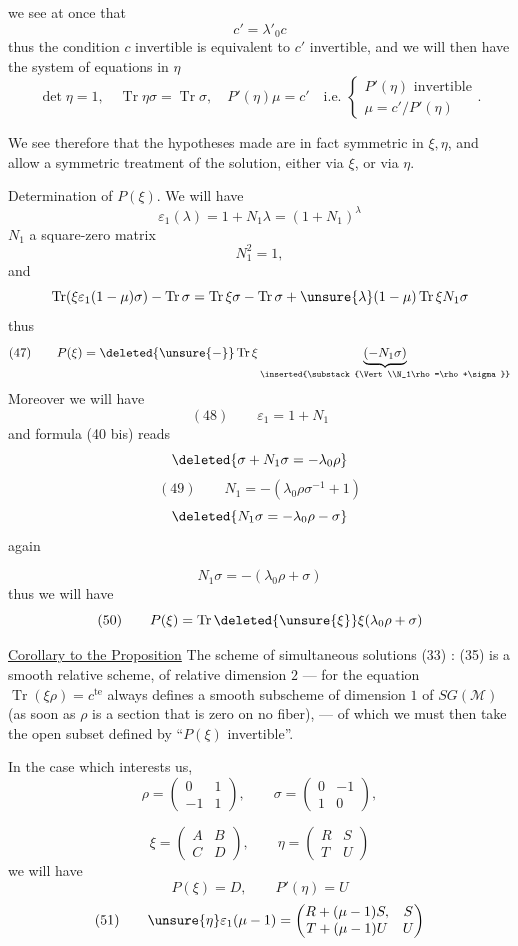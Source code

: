 
we see at once that
\[
c'=\lambda'_0c
\]
thus the condition $c$ invertible is equivalent to $c'$ invertible,
and we will then have the system of equations in $\eta$
\[
\det\eta=1,\quad
\operatorname{Tr}\eta\sigma=\operatorname{Tr}\sigma,\quad
P'(\eta)\mu=c'\quad\text{i.e. }
\left\{
\begin{gathered}
P'(\eta)\text{ invertible}\\
\mu=c'/P'(\eta)
\end{gathered}
\right.
.
\]

We see therefore that the hypotheses made are in fact symmetric in
$\xi,\eta$, and allow a symmetric treatment of the solution,
either via $\xi$, or via $\eta$.

Determination of $P(\xi)$. We will have
\[
\varepsilon_1(\lambda)=1+N_1\lambda=(1+N_1)^\lambda
\]
$N_1$ a square-zero matrix
\[
N_1^2=1,
\]
and
\[
\operatorname{Tr}(\xi\varepsilon_1(1-\mu)\sigma)-\operatorname{Tr}\sigma
=\operatorname{Tr}\xi\sigma-\operatorname{Tr}\sigma
+\unsure{\lambda}(1-\mu)\operatorname{Tr}\xi N_1\sigma
\]
thus
\[
(47)\qquad
P(\xi)=\deleted{\unsure{-}}\operatorname{Tr}\xi
\underbrace{(-N_1\sigma)}_{\inserted{\substack{\Vert\\N_1\rho=\rho+\sigma}}}
\]
Moreover  we will have
\[
(48)\qquad \varepsilon_1=1+N_1
\]
and formula (40 bis) reads
\[
\deleted{\sigma+N_1\sigma=-\lambda_0\rho}
\]
\[
(49)\qquad N_1=-(\lambda_0\rho\sigma^{-1}+1)
\]
\[
\deleted{N_1\sigma=-\lambda_0\rho-\sigma}
\]
  again


\[
N_1\sigma=-(\lambda_0\rho+\sigma)
\]
thus we will have
\[
(50)\qquad
P(\xi)=\operatorname{Tr}\deleted{\unsure{\xi}}\xi(\lambda_0\rho+\sigma)
\]

\uline{Corollary to the Proposition} The scheme of simultaneous solutions
 (33) : (35)
 is a smooth relative scheme,
of relative dimension $2$ --- for the equation $\operatorname{Tr}(\xi\rho)=c^{\mathrm{te}}$
always defines a smooth subscheme of dimension $1$
of  $SG(\mathcal{M})$
(as soon as $\rho$ is a section that is zero on no fiber),
--- of which we must then take the open subset defined by
``$P(\xi)$ invertible''.

In the case which interests us,
\[
\rho=\begin{pmatrix}0&1\\-1&1\end{pmatrix},\qquad
\sigma=\begin{pmatrix}0&-1\\1&0\end{pmatrix},
\]

\[
\xi=\begin{pmatrix}A&B\\C&D\end{pmatrix},\qquad
\eta=\begin{pmatrix}R&S\\T&U\end{pmatrix}
\]
we will have
\[
P(\xi)=D,\qquad P'(\eta)=U
\]
\[
(51)\qquad
\unsure{\eta}\varepsilon_1(\mu-1)
=\begin{pmatrix}
R+(\mu-1)S,&S\\
T+(\mu-1)U&U
\end{pmatrix}
\]